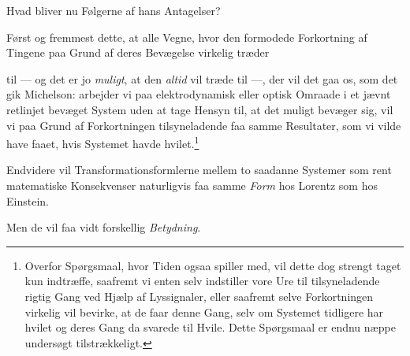 \documentclass[12pt,a4paper]{article}
\newcommand{\opage}[1]{\marginnote{\footnotesize\textit{[#1]}}}
\begin{document}
Hvad bliver nu Følgerne af hans Antagelser?

Først og fremmest dette, at alle Vegne, hvor den formodede Forkortning af
Tingene paa Grund af deres Bevægelse virkelig træder

\opage{205} til --- og det er jo \emph{muligt}, at den \emph{altid} vil træde til ---, der
vil det gaa os, som det gik Michelson: arbejder vi paa elektrodynamisk eller
optisk Omraade i et jævnt retlinjet bevæget System uden at tage Hensyn til, at
det muligt bevæger sig, vil vi paa Grund af Forkortningen tilsyneladende faa
samme Resultater, som vi vilde have faaet, hvis Systemet havde
hvilet.\footnote{Overfor Spørgsmaal, hvor Tiden ogsaa spiller med, vil dette
dog strengt taget kun indtræffe, saafremt vi enten selv indstiller vore Ure til
tilsyneladende rigtig Gang ved Hjælp af Lyssignaler, eller saafremt selve
Forkortningen virkelig vil bevirke, at de faar denne Gang, selv om Systemet
tidligere har hvilet og deres Gang da svarede til Hvile. Dette Spørgsmaal er
endnu næppe undersøgt tilstrækkeligt.}

Endvidere vil Transformationsformlerne mellem to saadanne Systemer som rent
matematiske Konsekvenser naturligvis faa samme \emph{Form} hos Lorentz som hos
Einstein.

Men de vil faa vidt forskellig \emph{Betydning}.
\end{document}
